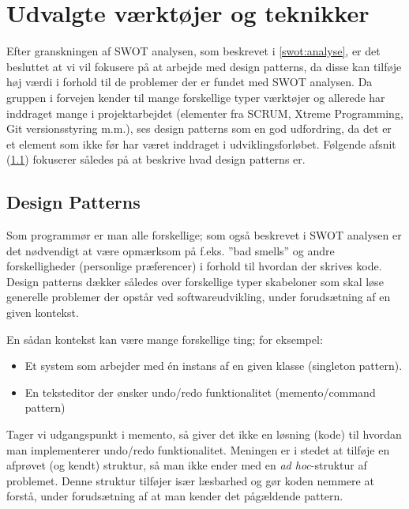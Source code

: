 \section{Udvalgte værktøjer og teknikker}
Efter granskningen af SWOT analysen, som beskrevet i \cref{swot:analyse}, er det besluttet at vi vil fokusere på at arbejde med design patterns, da disse kan tilføje høj værdi i forhold til de problemer der er fundet med SWOT analysen.
Da gruppen i forvejen kender til mange forskellige typer værktøjer og allerede har inddraget mange i projektarbejdet (elementer fra SCRUM, Xtreme Programming, Git versionsstyring m.m.), ses design patterns som en god udfordring, da det er et element som ikke før har været inddraget i udviklingsforløbet.
Følgende afsnit (\cref{design_patterns_beskrivelse}) fokuserer således på at beskrive hvad design patterns er.

\subsection{Design Patterns}\label{design_patterns_beskrivelse}
Som programmør er man alle forskellige; som også beskrevet i SWOT analysen er det nødvendigt at være opmærksom på f.eks. ''bad smells'' og andre forskelligheder (personlige præferencer) i forhold til hvordan der skrives kode.
Design patterns dækker således over forskellige typer skabeloner som skal løse generelle problemer der opstår ved softwareudvikling, under forudsætning af en given kontekst.

En sådan kontekst kan være mange forskellige ting; for eksempel:

\begin{itemize}
\item Et system som arbejder med én instans af en given klasse (singleton pattern).
\item En teksteditor der ønsker undo/redo funktionalitet (memento/command pattern)
\end{itemize}

Tager vi udgangspunkt i memento, så giver det ikke en løsning (kode) til hvordan man implementerer undo/redo funktionalitet.
Meningen er i stedet at tilføje en afprøvet (og kendt) struktur, så man ikke ender med en \textit{ad hoc}-struktur af problemet.
Denne struktur tilføjer især læsbarhed og gør koden nemmere at forstå, under forudsætning af at man kender det pågældende pattern.